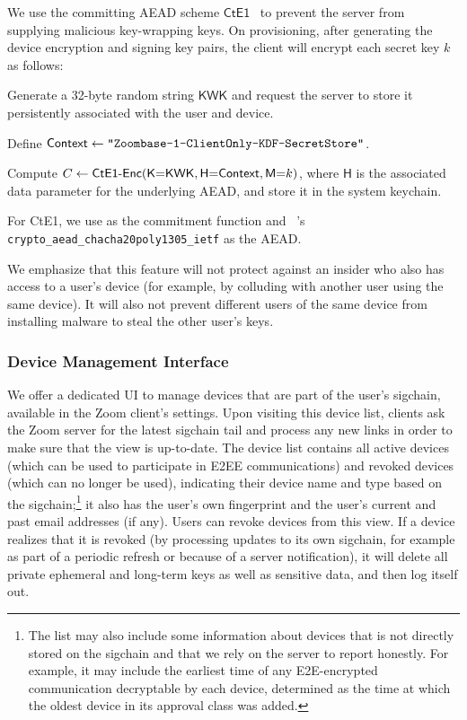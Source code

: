 We use the committing AEAD scheme $\mathsf{CtE1}$~\cite{messagefranking} to prevent the server from
supplying malicious key-wrapping keys.
%
On provisioning, after generating the device encryption and signing key pairs, the client will
encrypt each secret key $k$ as follows:
\begingroup
\RaggedRight
\begin{enumerate*}
\item Generate a 32-byte random string $\mathsf{KWK}$ and request the server to store it
persistently associated with the user and device.
\item Define ${\sf Context} \leftarrow \texttt{"Zoombase-1-ClientOnly-KDF-SecretStore"}$.
\item Compute $C \leftarrow \textsf{CtE1-Enc}(\textsf{K}{=}\textsf{KWK}, \textsf{H}{=}{\sf Context},
\textsf{M}{=}k)$, where $\textsf{H}$ is the associated data parameter for the underlying AEAD, and
store it in the system keychain.
\end{enumerate*}
\endgroup

For \textsf{CtE1}, we use \HMACSHATWO as the commitment function and
\sodium{}~\cite{libsodium}'s \linebreak \texttt{crypto\_aead\_chacha20poly1305\_ietf} as the AEAD.

We emphasize that this feature will not protect against an insider who also has access to a user's
device (for example, by colluding with another user using the same device). It will also not prevent
different users of the same device from installing malware to steal the other user's keys.

\subsubsection{Device Management Interface}
\label{subsubsec:devicemgmt}

We offer a dedicated UI to manage devices that are part of the user's sigchain, available in the
Zoom client's settings. Upon visiting this device list, clients ask the Zoom server for the latest
sigchain tail and process any new links in order to make sure that the view is up-to-date. The
device list contains all active devices (which can be used to participate in E2EE communications)
and revoked devices (which can no longer be used), indicating their device name and type based on
the sigchain;\footnote{The list may also include some information about devices that is not directly
stored on the sigchain and that we rely on the server to report honestly. For example, it may
include the earliest time of any E2E-encrypted communication decryptable by each device, determined
as the time at which the oldest device in its approval class was added.} it also has the user's own
fingerprint and the user's current and past email addresses (if any). Users can revoke devices from
this view. If a device realizes that it is revoked (by processing updates to its own sigchain, for
example as part of a periodic refresh or because of a server notification), it will delete all
private ephemeral and long-term keys as well as sensitive data, and then log itself out.

